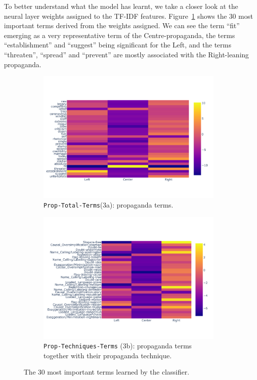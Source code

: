 To better understand what the model has learnt, we take a closer look at the neural layer weights assigned to the TF-IDF features.
Figure~\ref{fig:terms_weights_3a} shows the 30 most important terms derived from the weights assigned.
We can see the term ``fit'' emerging as a very representative term of the Centre-propaganda, the terms ``establishment'' and ``suggest'' being significant for the Left, and the terms ``threaten'', ``spread'' and ``prevent'' are mostly associated with the Right-leaning propaganda.


\begin{figure}[!htbp]
    \centering
     \begin{subfigure}[b]{\linewidth}
         \centering
         \includegraphics[width=0.75\linewidth]{figures/baly_media_weights_propaganda_tf_idf-small.pdf}
         \caption{\texttt{Prop-Total-Terms}(3a): propaganda terms.}
         \label{fig:terms_weights_3a}
     \end{subfigure}
    \begin{subfigure}[b]{\linewidth}
         \centering 
         \includegraphics[width=0.75\linewidth]{figures/baly_media_weights_propaganda_techniques_tf_idf-small.pdf}
         \caption{\texttt{Prop-Techniques-Terms} (3b): propaganda terms together with their propaganda technique.}
         \label{fig:terms_weights_3b}
     \end{subfigure}
    \caption{The 30 most important terms learned by the classifier.}
    \label{fig:terms_weights}
\end{figure}

